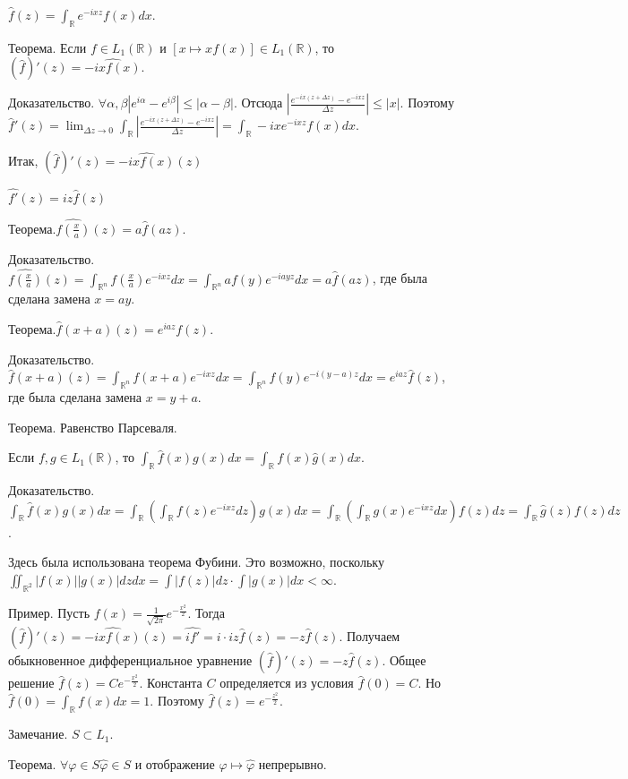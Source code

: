 \documentclass[12pt,titlepage, a4paper]{article}
\begin{document}
$\hat f(z)=\int_{\mathbb{R}}e^{-ixz}f(x)dx$.

Теорема. Если $f\in L_1(\mathbb{R})$ и $[x\mapsto xf(x)]\in
L_1(\mathbb{R})$, то $(\hat f)'(z)=\widehat{-ixf(x)}$.

Доказательство. $\forall \alpha ,\beta
|e^{i\alpha}-e^{i\beta}|\leqslant |\alpha-\beta|$. Отсюда
$|\frac{e^{-ix(z+\Delta z)}-e^{-ixz}}{\Delta z}|\leqslant |x|$.
Поэтому $\hat f'(z)=\lim_{\Delta z\longrightarrow
0}\int_{\mathbb{R}} |\frac{e^{-ix(z+\Delta z)}-e^{-ixz}}{\Delta
z}|=\int_{\mathbb{R}}-ixe^{-ixz}f(x)dx$.

Итак, $(\hat f)'(z)=\widehat{-ixf(x)}(z)$

$\widehat {f'}(z)=iz\hat f(z)$

Теорема.$\widehat{f(\frac{x}{a})}(z)=a\hat f(az)$.

Доказательство.
$\widehat{f(\frac{x}{a})}(z)=\int_{\mathbb{R}^n}f(\frac{x}{a})e^{-ixz}dx=
\int_{\mathbb{R}^n}af(y)e^{-iayz}dx=a\hat f(az)$, где была сделана
замена $x=ay$.

Теорема.$\hat f(x+a)(z)=e^{iaz}f(z)$.

Доказательство. $\hat
f(x+a)(z)=\int_{\mathbb{R}^n}f(x+a)e^{-ixz}dx=
\int_{\mathbb{R}^n}f(y)e^{-i(y-a)z}dx=e^{iaz}\hat f(z)$, где была
сделана замена $x=y+a$.

Теорема. Равенство Парсеваля.

Если $f,g\in L_1(\mathbb{R})$, то $\int_\mathbb{R}\hat
f(x)g(x)dx=\int_\mathbb{R}f(x)\hat g(x)dx$.

Доказательство. $\int_\mathbb{R}\hat f(x)g(x)dx=
\int_\mathbb{R}(\int_\mathbb{R}f(z)e^{-ixz}dz)g(x)dx=
\int_\mathbb{R}(\int_\mathbb{R}g(x)e^{-ixz}dx)f(z)dz=
\int_\mathbb{R}\hat g(z)f(z)dz$.

Здесь была использована теорема Фубини. Это возможно, поскольку
$\iint_{\mathbb{R}^2}|f(x)||g(x)|dzdx=\int |f(z)|dz\cdot\int
|g(x)|dx <\infty$.

Пример. Пусть $f(x)=\frac{1}{\sqrt{2\pi}}e^{-\frac{x^2}{2}}$.
Тогда $(\hat f)'(z)=\widehat {-ixf(x)}(z)=\widehat {if'}=i\cdot
iz\hat f(z)=-z\hat f(z)$. Получаем обыкновенное дифференциальное
уравнение $(\hat f)'(z)=-z\hat f(z)$. Общее решение $\hat
f(z)=Ce^{-\frac{x^2}{2}}$. Константа $C$ определяется из условия
$\hat f(0)=C$. Но $\hat f(0)=\int_{\mathbb{R}}f(x)dx=1$. Поэтому
$\hat f(z)=e^{-\frac{z^2}{2}}$.

Замечание. $S\subset L_1$.

Теорема. $\forall\varphi\in S \hat \varphi\in S$ и отображение
$\varphi \mapsto \hat \varphi$ непрерывно.
\end{document}
